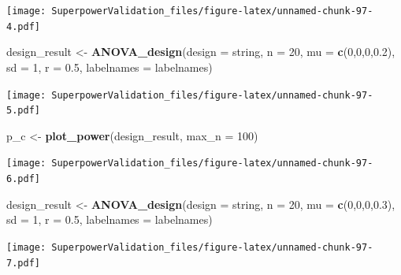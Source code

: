 \documentclass[]{book}
\newenvironment{Shaded}{\begin{snugshade}}{\end{snugshade}}
\newcommand{\DataTypeTok}[1]{\textcolor[rgb]{0.13,0.29,0.53}{#1}}
\newcommand{\DecValTok}[1]{\textcolor[rgb]{0.00,0.00,0.81}{#1}}
\newcommand{\FloatTok}[1]{\textcolor[rgb]{0.00,0.00,0.81}{#1}}
\newcommand{\KeywordTok}[1]{\textcolor[rgb]{0.13,0.29,0.53}{\textbf{#1}}}
\newcommand{\NormalTok}[1]{#1}
\newcommand{\StringTok}[1]{\textcolor[rgb]{0.31,0.60,0.02}{#1}}
\begin{document}
\texttt{[image: SuperpowerValidation\_files/figure-latex/unnamed-chunk-97-4.pdf]}

\begin{Shaded}
\begin{Highlighting}[]
\NormalTok{design_result <-}\StringTok{ }\KeywordTok{ANOVA_design}\NormalTok{(}\DataTypeTok{design =}\NormalTok{ string,}
                              \DataTypeTok{n =} \DecValTok{20}\NormalTok{, }
                              \DataTypeTok{mu =} \KeywordTok{c}\NormalTok{(}\DecValTok{0}\NormalTok{,}\DecValTok{0}\NormalTok{,}\DecValTok{0}\NormalTok{,}\FloatTok{0.2}\NormalTok{), }
                              \DataTypeTok{sd =} \DecValTok{1}\NormalTok{, }
                              \DataTypeTok{r =} \FloatTok{0.5}\NormalTok{, }
                              \DataTypeTok{labelnames =}\NormalTok{ labelnames)}
\end{Highlighting}
\end{Shaded}

\texttt{[image: SuperpowerValidation\_files/figure-latex/unnamed-chunk-97-5.pdf]}

\begin{Shaded}
\begin{Highlighting}[]
\NormalTok{p_c <-}\StringTok{ }\KeywordTok{plot_power}\NormalTok{(design_result,}
                      \DataTypeTok{max_n =} \DecValTok{100}\NormalTok{)}
\end{Highlighting}
\end{Shaded}

\texttt{[image: SuperpowerValidation\_files/figure-latex/unnamed-chunk-97-6.pdf]}

\begin{Shaded}
\begin{Highlighting}[]
\NormalTok{design_result <-}\StringTok{ }\KeywordTok{ANOVA_design}\NormalTok{(}\DataTypeTok{design =}\NormalTok{ string,}
                              \DataTypeTok{n =} \DecValTok{20}\NormalTok{, }
                              \DataTypeTok{mu =} \KeywordTok{c}\NormalTok{(}\DecValTok{0}\NormalTok{,}\DecValTok{0}\NormalTok{,}\DecValTok{0}\NormalTok{,}\FloatTok{0.3}\NormalTok{), }
                              \DataTypeTok{sd =} \DecValTok{1}\NormalTok{, }
                              \DataTypeTok{r =} \FloatTok{0.5}\NormalTok{, }
                              \DataTypeTok{labelnames =}\NormalTok{ labelnames)}
\end{Highlighting}
\end{Shaded}

\texttt{[image: SuperpowerValidation\_files/figure-latex/unnamed-chunk-97-7.pdf]}
\end{document}
